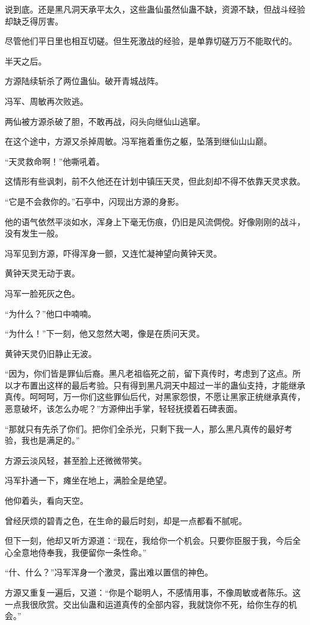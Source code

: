 \begin{this_body}
说到底。还是黑凡洞天承平太久，这些蛊仙虽然仙蛊不缺，资源不缺，但战斗经验却缺乏得厉害。

尽管他们平日里也相互切磋。但生死激战的经验，是单靠切磋万万不能取代的。

半天之后。

方源陆续斩杀了两位蛊仙。破开青城战阵。

冯军、周敏再次败逃。

两仙被方源杀破了胆，不敢再战，闷头向继仙山逃窜。

在这个途中，方源又杀掉周敏。冯军拖着重伤之躯，坠落到继仙山山巅。

“天灵救命啊！”他嘶吼着。

这情形有些讽刺，前不久他还在计划中镇压天灵，但此刻却不得不依靠天灵求救。

“它是不会救你的。”石亭中，闪现出方源的身影。

他的语气依然平淡如水，浑身上下毫无伤痕，仍旧是风流倜傥。好像刚刚的战斗，没有发生一般。

冯军见到方源，吓得浑身一颤，又连忙凝神望向黄钟天灵。

黄钟天灵无动于衷。

冯军一脸死灰之色。

“为什么？”他口中喃喃。

“为什么！”下一刻，他又忽然大喝，像是在质问天灵。

黄钟天灵仍旧静止无波。

“因为，你们皆是罪仙后裔。黑凡老祖临死之前，留下真传时，考虑到了这点。所以才布置出这样的最后考验。只有得到黑凡洞天中超过一半的蛊仙支持，才能继承真传。呵呵呵，万一你们这些罪仙后代，对黑家怨恨，不愿让黑家正统继承真传，恶意破坏，该怎么办呢？”方源伸出手掌，轻轻抚摸着石碑表面。

“那就只有先杀了你们。把你们全杀光，只剩下我一人，那么黑凡真传的最好考验，我也是满足的。”

方源云淡风轻，甚至脸上还微微带笑。

冯军扑通一下，瘫坐在地上，满脸全是绝望。

他仰着头，看向天空。

曾经厌烦的碧青之色，在生命的最后时刻，却是一点都看不腻呢。

但下一刻，他却又听方源道：“现在，我给你一个机会。只要你臣服于我，今后全心全意地侍奉我，我便留你一条性命。”

“什、什么？”冯军浑身一个激灵，露出难以置信的神色。

方源又重复一遍后，又道：“你是个聪明人，不感情用事，不像周敏或者陈乐。这一点我很欣赏。交出仙蛊和运道真传的全部内容，我就饶你不死，给你生存的机会。”


\end{this_body}
